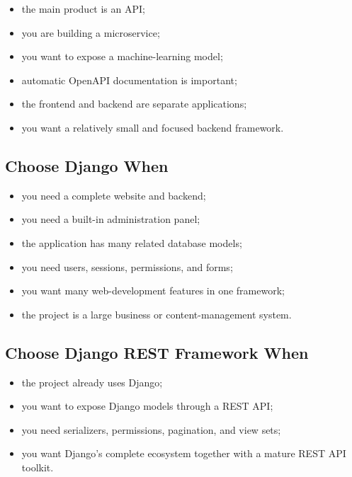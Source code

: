 \documentclass[a4paper]{article}
\begin{document}
            \begin{itemize}
                \item the main product is an API;
                \item you are building a microservice;
                \item you want to expose a machine-learning model;
                \item automatic OpenAPI documentation is important;
                \item the frontend and backend are separate applications;
                \item you want a relatively small and focused backend framework.
            \end{itemize}
        
        \subsection*{Choose Django When}
            
            \begin{itemize}
                \item you need a complete website and backend;
                \item you need a built-in administration panel;
                \item the application has many related database models;
                \item you need users, sessions, permissions, and forms;
                \item you want many web-development features in one framework;
                \item the project is a large business or content-management system.
            \end{itemize}
        
        \subsection*{Choose Django REST Framework When}
            
            \begin{itemize}
                \item the project already uses Django;
                \item you want to expose Django models through a REST API;
                \item you need serializers, permissions, pagination, and view sets;
                \item you want Django's complete ecosystem together with a mature
                REST API toolkit.
            \end{itemize}
    
\end{document}
